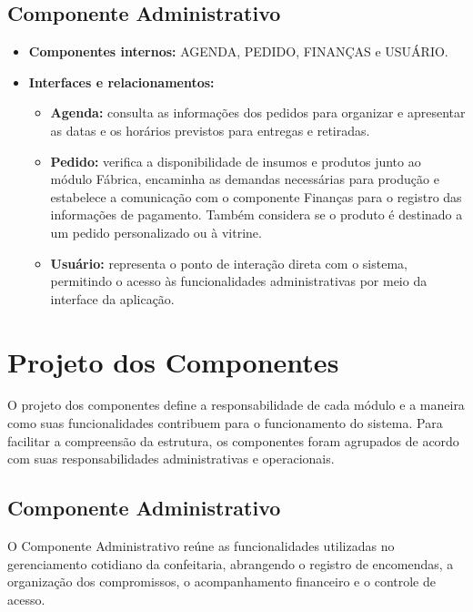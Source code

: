 \subsection*{Componente Administrativo}

\begin{itemize}
    \item \textbf{Componentes internos:} AGENDA, PEDIDO, FINANÇAS e USUÁRIO.
    
    \item \textbf{Interfaces e relacionamentos:}
    \begin{itemize}
        \item \textbf{Agenda:} consulta as informações dos pedidos para organizar e apresentar as datas e os horários previstos para entregas e retiradas.
        
        \item \textbf{Pedido:} verifica a disponibilidade de insumos e produtos junto ao módulo Fábrica, encaminha as demandas necessárias para produção e estabelece a comunicação com o componente Finanças para o registro das informações de pagamento. Também considera se o produto é destinado a um pedido personalizado ou à vitrine.
        
        \item \textbf{Usuário:} representa o ponto de interação direta com o sistema, permitindo o acesso às funcionalidades administrativas por meio da interface da aplicação.
    \end{itemize}
\end{itemize}


\section{Projeto dos Componentes}

O projeto dos componentes define a responsabilidade de cada módulo e a maneira como suas funcionalidades contribuem para o funcionamento do sistema. Para facilitar a compreensão da estrutura, os componentes foram agrupados de acordo com suas responsabilidades administrativas e operacionais.

\subsection{Componente Administrativo}

O Componente Administrativo reúne as funcionalidades utilizadas no gerenciamento cotidiano da confeitaria, abrangendo o registro de encomendas, a organização dos compromissos, o acompanhamento financeiro e o controle de acesso.

